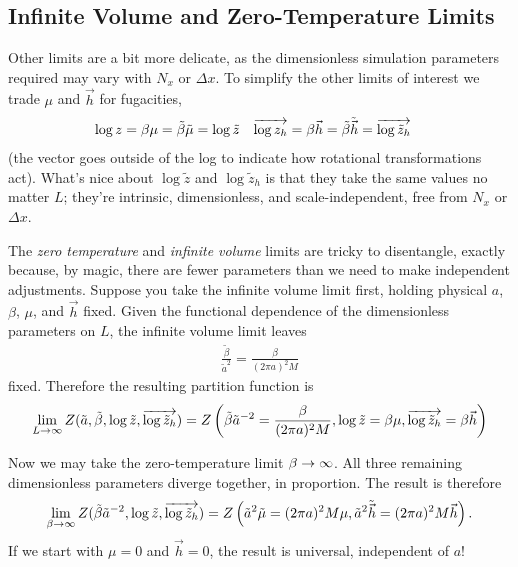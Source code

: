 \subsection{Infinite Volume and Zero-Temperature Limits}\label{sec:thermodynamic limit}

Other limits are a bit more delicate, as the dimensionless simulation parameters required may vary with $N_x$ or $\Delta x$.
To simplify the other limits of interest we trade $\mu$ and $\vec{h}$ for fugacities,
\begin{align}
    \log z &= \beta \mu = \tilde{\beta} \tilde{\mu} = \log \tilde{z}
    &
    \overrightarrow{\log z_h} &= \beta \vec{h} = \tilde{\beta}\tilde{\vec{h}} = \overrightarrow{\log \tilde{z}_h}
\end{align}
(the vector goes outside of the log to indicate how rotational transformations act).
What's nice about $\log \tilde{z}$ and $\log \tilde{z}_h$ is that they take the same values no matter $L$; they're intrinsic, dimensionless, and scale-independent, free from $N_x$ or $\Delta x$.

The \emph{zero temperature} and \emph{infinite volume} limits are tricky to disentangle, exactly because, by magic, there are fewer parameters than we need to make independent adjustments.
Suppose you take the infinite volume limit first, holding physical $a$, $\beta$, $\mu$, and $\vec{h}$ fixed.
Given the functional dependence of the dimensionless parameters on $L$, the infinite volume limit leaves
\begin{align}
    \frac{\tilde{\beta}}{\tilde{a}^2} = \frac{\beta}{(2\pi a)^2 M}
\end{align}
fixed.
Therefore the resulting partition function is
\begin{align}
    \lim_{L\rightarrow\infty} Z(\tilde{a}, \tilde{\beta}, \log\tilde{z}, \overrightarrow{\log \tilde{z}_h})
    =
    Z\left(
        \tilde{\beta}\tilde{a}^{-2} = \frac{\beta}{(2\pi a)^2 M},
        \log\tilde{z} = \beta \mu,
        \overrightarrow{\log \tilde{z}_h} = \beta \vec{h}
        \right)
    \label{eq:infinite volume}
\end{align}

Now we may take the zero-temperature limit $\beta\rightarrow\infty$.
All three remaining dimensionless parameters diverge together, in proportion.
The result is therefore
\begin{align}
    \lim_{\beta\rightarrow\infty} Z(\tilde{\beta}\tilde{a}^{-2}, \log\tilde{z}, \overrightarrow{\log \tilde{z}_h})
    =
    Z\left( \tilde{a}^2\tilde{\mu} = (2\pi a)^2 M \mu, \tilde{a}^2 \tilde{\vec{h}} = (2\pi a)^2 M \vec{h} \right).
    \label{eq:volume then temperature}
\end{align}
If we start with $\mu=0$ and $\vec{h}=0$, the result is universal, independent of $a$!

